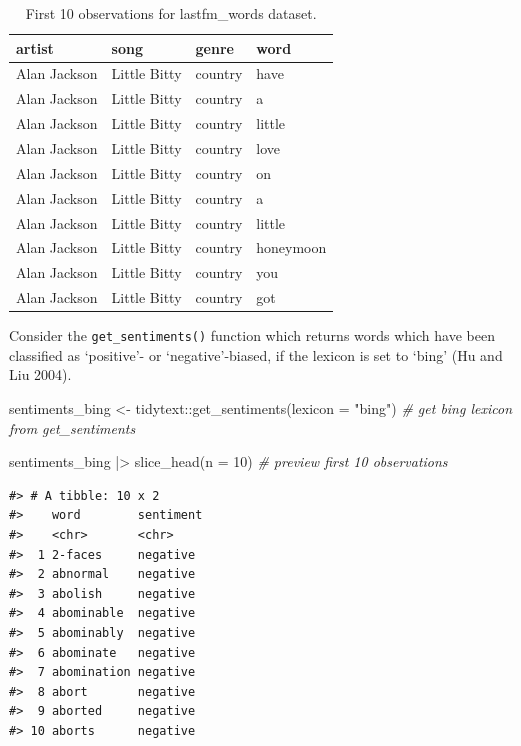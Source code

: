 \documentclass[
  letterpaper,
]{scrbook}
\newenvironment{Shaded}{\begin{snugshade}}{\end{snugshade}}
\newcommand{\AttributeTok}[1]{\textcolor[rgb]{0.00,0.00,0.00}{#1}}
\newcommand{\CommentTok}[1]{\textcolor[rgb]{0.00,0.00,0.00}{\textit{#1}}}
\newcommand{\DecValTok}[1]{\textcolor[rgb]{0.00,0.00,0.00}{#1}}
\newcommand{\FunctionTok}[1]{\textcolor[rgb]{0.00,0.00,0.00}{#1}}
\newcommand{\NormalTok}[1]{\textcolor[rgb]{0.00,0.00,0.00}{#1}}
\newcommand{\OtherTok}[1]{\textcolor[rgb]{0.00,0.00,0.00}{#1}}
\newcommand{\SpecialCharTok}[1]{\textcolor[rgb]{0.00,0.00,0.00}{#1}}
\newcommand{\StringTok}[1]{\textcolor[rgb]{0.00,0.00,0.00}{#1}}
\begin{document}
\hypertarget{tbl-td-lastfm-tokens}{}
\begin{table}
\caption{\label{tbl-td-lastfm-tokens}First 10 observations for lastfm\_words dataset. }\tabularnewline

\centering
\begin{tabular}{llll}
\toprule
artist & song & genre & word\\
\midrule
Alan Jackson & Little Bitty & country & have\\
Alan Jackson & Little Bitty & country & a\\
Alan Jackson & Little Bitty & country & little\\
Alan Jackson & Little Bitty & country & love\\
Alan Jackson & Little Bitty & country & on\\
\addlinespace
Alan Jackson & Little Bitty & country & a\\
Alan Jackson & Little Bitty & country & little\\
Alan Jackson & Little Bitty & country & honeymoon\\
Alan Jackson & Little Bitty & country & you\\
Alan Jackson & Little Bitty & country & got\\
\bottomrule
\end{tabular}
\end{table}

Consider the \texttt{get\_sentiments()} function which returns words
which have been classified as `positive'- or `negative'-biased, if the
lexicon is set to `bing' (Hu and Liu 2004).

\begin{Shaded}
\begin{Highlighting}[]
\NormalTok{sentiments\_bing }\OtherTok{\textless{}{-}} 
\NormalTok{  tidytext}\SpecialCharTok{::}\FunctionTok{get\_sentiments}\NormalTok{(}\AttributeTok{lexicon =} \StringTok{"bing"}\NormalTok{) }\CommentTok{\# get \textquotesingle{}bing\textquotesingle{} lexicon from get\_sentiments}

\NormalTok{sentiments\_bing }\SpecialCharTok{|\textgreater{}} 
  \FunctionTok{slice\_head}\NormalTok{(}\AttributeTok{n =} \DecValTok{10}\NormalTok{) }\CommentTok{\# preview first 10 observations}
\end{Highlighting}
\end{Shaded}

\begin{verbatim}
#> # A tibble: 10 x 2
#>    word        sentiment
#>    <chr>       <chr>    
#>  1 2-faces     negative 
#>  2 abnormal    negative 
#>  3 abolish     negative 
#>  4 abominable  negative 
#>  5 abominably  negative 
#>  6 abominate   negative 
#>  7 abomination negative 
#>  8 abort       negative 
#>  9 aborted     negative 
#> 10 aborts      negative
\end{verbatim}
\end{document}
